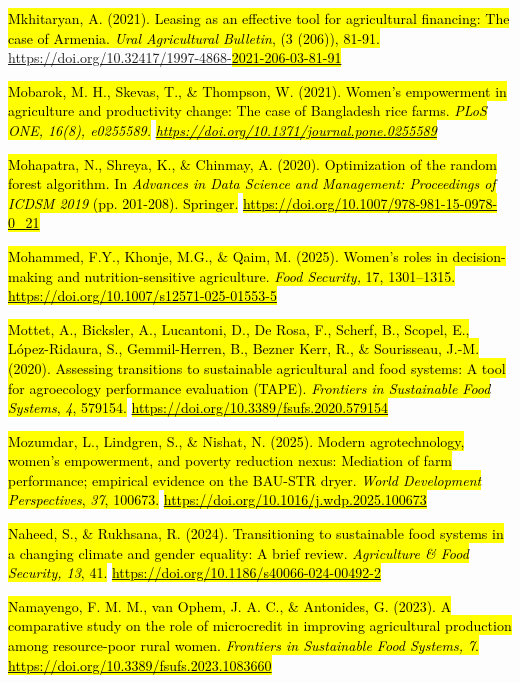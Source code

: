 \hl{Mkhitaryan, A. (2021). Leasing as an effective tool for agricultural
financing: The case of Armenia. \emph{Ural Agricultural Bulletin}, (3
(206)), 81-91.}
\href{https://doi.org/10.32417/1997-4868-2021-206-03-81-91}{\hl{}https://doi.org/10.32417/1997-4868-\hl{2021-206-03-81-91}}

\hl{Mobarok, M. H., Skevas, T., \& Thompson, W. (2021). Women's
empowerment in agriculture and productivity change: The case of
Bangladesh rice farms. \emph{PLoS ONE, 16(8), e0255589.}}
\href{https://doi.org/10.1371/journal.pone.0255589}{\emph{\hl{https://doi.org/10.1371/journal.pone.0255589}}}

\hl{Mohapatra, N., Shreya, K., \& Chinmay, A. (2020). Optimization of
the random forest algorithm. In \emph{Advances in Data Science and
Management: Proceedings of ICDSM 2019} (pp. 201-208). Springer.}
\href{https://doi.org/10.1007/978-981-15-0978-0_21}{\hl{https://doi.org/10.1007/978-981-15-0978-0\_21}}

\hl{Mohammed, F.Y., Khonje, M.G., \& Qaim, M. (2025). Women's roles in
decision-making and nutrition-sensitive agriculture. \emph{Food
Security,} 17, 1301--1315.}
\href{https://doi.org/10.1007/s12571-025-01553-5}{\hl{https://doi.org/10.1007/s12571-025-01553-5}}

\hl{Mottet, A., Bicksler, A., Lucantoni, D., De Rosa, F., Scherf, B.,
Scopel, E., López-Ridaura, S., Gemmil-Herren, B., Bezner Kerr, R., \&
Sourisseau, J.-M. (2020). Assessing transitions to sustainable
agricultural and food systems: A tool for agroecology performance
evaluation (TAPE). \emph{Frontiers in Sustainable Food Systems},
\emph{4}, 579154.}
\href{https://doi.org/10.3389/fsufs.2020.579154}{\hl{https://doi.org/10.3389/fsufs.2020.579154}}

\hl{Mozumdar, L., Lindgren, S., \& Nishat, N. (2025). Modern
agrotechnology, women's empowerment, and poverty reduction nexus:
Mediation of farm performance; empirical evidence on the BAU-STR dryer.
\emph{World Development Perspectives}, \emph{37}, 100673.}
\href{https://doi.org/10.1016/j.wdp.2025.100673}{\hl{https://doi.org/10.1016/j.wdp.2025.100673}}

\hl{Naheed, S., \& Rukhsana, R. (2024). Transitioning to sustainable
food systems in a changing climate and gender equality: A brief review.
\emph{Agriculture \& Food Security, 13}, 41.}
\href{https://doi.org/10.1186/s40066-024-00492-2}{\hl{https://doi.org/10.1186/s40066-024-00492-2}}

\hl{Namayengo, F. M. M., van Ophem, J. A. C., \& Antonides, G. (2023). A
comparative study on the role of microcredit in improving agricultural
production among resource-poor rural women. \emph{Frontiers in
Sustainable Food Systems, 7}.}
\href{https://doi.org/10.3389/fsufs.2023.1083660}{\hl{https://doi.org/10.3389/fsufs.2023.1083660}}

